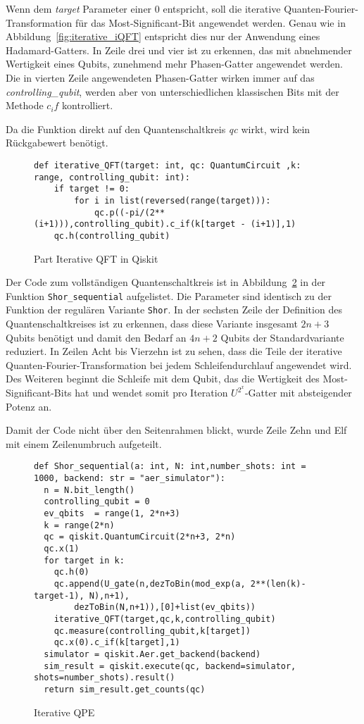 Wenn dem \textit{target} Parameter einer 0 entspricht, 
soll die iterative Quanten-Fourier-Transformation für das Most-Significant-Bit angewendet werden.
Genau wie in Abbildung~\ref{fig:iterative_iQFT} entspricht dies nur der Anwendung eines Hadamard-Gatters.
In Zeile drei und vier ist zu erkennen, 
das mit abnehmender Wertigkeit eines Qubits, zunehmend mehr Phasen-Gatter angewendet werden.
Die in vierten Zeile angewendeten Phasen-Gatter wirken immer auf das \textit{controlling\_qubit}, 
werden aber von unterschiedlichen klassischen Bits mit der Methode \(c_if\) kontrolliert.

Da die Funktion direkt auf den Quantenschaltkreis \textit{qc} wirkt, 
wird kein Rückgabewert benötigt.
\begin{figure}[H]
  \caption{Part Iterative QFT in Qiskit}
  \label{code:iterativeQFT}
\begin{verbatim}    
def iterative_QFT(target: int, qc: QuantumCircuit ,k: range, controlling_qubit: int):
    if target != 0:
        for i in list(reversed(range(target))):
            qc.p((-pi/(2**(i+1))),controlling_qubit).c_if(k[target - (i+1)],1)
    qc.h(controlling_qubit)
  \end{verbatim}
\end{figure}

Der Code zum vollständigen Quantenschaltkreis ist in Abbildung~\ref{code:IterativeQPE} in der Funktion \texttt{Shor\_sequential} aufgelistet.
Die Parameter sind identisch zu der Funktion der regulären Variante \texttt{Shor}.
In der sechsten Zeile der Definition des Quantenschaltkreises ist zu erkennen, 
dass diese Variante insgesamt \(2n+3\) Qubits benötigt und damit den Bedarf an \(4n+2\) Qubits der Standardvariante reduziert.
In Zeilen Acht bis Vierzehn ist zu sehen, 
dass die Teile der iterative Quanten-Fourier-Transformation bei jedem Schleifendurchlauf angewendet wird. 
Des Weiteren beginnt die Schleife mit dem Qubit, 
das die Wertigkeit des Most-Significant-Bits hat 
und wendet somit pro Iteration \(U^{2^x}\)-Gatter mit absteigender Potenz an.

Damit der Code nicht über den Seitenrahmen blickt, 
wurde Zeile Zehn und Elf mit einem Zeilenumbruch aufgeteilt.

\begin{figure}[H]
  \caption{Iterative QPE}
  \label{code:IterativeQPE}
\begin{verbatim}    
def Shor_sequential(a: int, N: int,number_shots: int = 1000, backend: str = "aer_simulator"):
  n = N.bit_length()
  controlling_qubit = 0
  ev_qbits  = range(1, 2*n+3)
  k = range(2*n)
  qc = qiskit.QuantumCircuit(2*n+3, 2*n) 
  qc.x(1)
  for target in k:
    qc.h(0)
    qc.append(U_gate(n,dezToBin(mod_exp(a, 2**(len(k)-target-1), N),n+1),
        dezToBin(N,n+1)),[0]+list(ev_qbits))
    iterative_QFT(target,qc,k,controlling_qubit)
    qc.measure(controlling_qubit,k[target])
    qc.x(0).c_if(k[target],1)
  simulator = qiskit.Aer.get_backend(backend)
  sim_result = qiskit.execute(qc, backend=simulator, shots=number_shots).result()
  return sim_result.get_counts(qc)
  \end{verbatim}
\end{figure}

